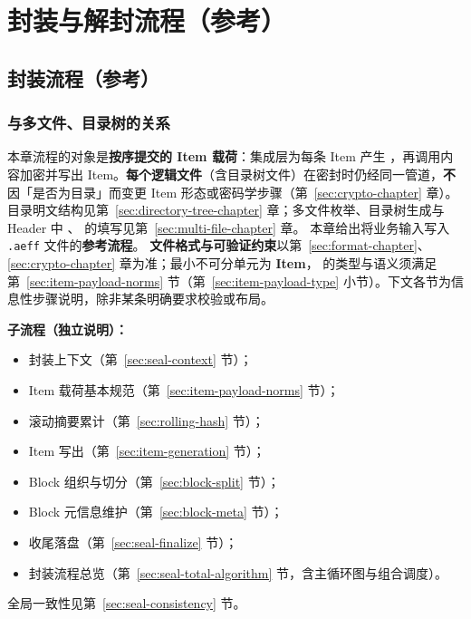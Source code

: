 \section{封装与解封流程（参考）}\label{app:seal-unseal-reference}

\subsection{封装流程（参考）}\label{sec:seal-chapter}

\subsubsection{与多文件、目录树的关系}\label{sec:seal-byte-stream-scope}

本章流程的对象是\textbf{按序提交的 Item 载荷}：集成层为每条 Item 产生 ，再调用内容加密并写出 Item。\textbf{每个逻辑文件}（含目录树文件）在密封时仍经同一管道，\textbf{不}因「是否为目录」而变更 Item 形态或密码学步骤（第~\ref{sec:crypto-chapter} 章）。
目录明文结构见第~\ref{sec:directory-tree-chapter} 章；多文件枚举、目录树生成与 Header 中 、 的填写见第~\ref{sec:multi-file-chapter} 章。
本章给出将业务输入写入 \texttt{.aeff} 文件的\textbf{参考流程}。
\textbf{文件格式与可验证约束}以第~\ref{sec:format-chapter}、\ref{sec:crypto-chapter} 章为准；最小不可分单元为 \textbf{Item}， 的类型与语义须满足第~\ref{sec:item-payload-norms} 节（第~\ref{sec:item-payload-type} 小节）。下文各节为信息性步骤说明，除非某条明确要求校验或布局。

\textbf{子流程（独立说明）：}
\begin{itemize}
  \item 封装上下文（第~\ref{sec:seal-context} 节）；
  \item Item 载荷基本规范（第~\ref{sec:item-payload-norms} 节）；
  \item 滚动摘要累计（第~\ref{sec:rolling-hash} 节）；
  \item Item 写出（第~\ref{sec:item-generation} 节）；
  \item Block 组织与切分（第~\ref{sec:block-split} 节）；
  \item Block 元信息维护（第~\ref{sec:block-meta} 节）；
  \item 收尾落盘（第~\ref{sec:seal-finalize} 节）；
  \item 封装流程总览（第~\ref{sec:seal-total-algorithm} 节，含主循环图与组合调度）。
\end{itemize}
全局一致性见第~\ref{sec:seal-consistency} 节。

